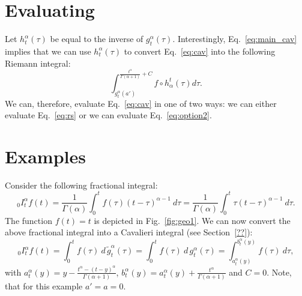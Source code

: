\documentclass[twoside,reqno,11pt]{fcaa-var} %
\begin{document}

\section{Evaluating}
\noindent
Let $h_t^{\alpha}(\tau)$ be equal to the inverse of $g_t^{\alpha}(\tau)$. Interestingly, Eq.~\eqref{eq:main_cav} implies that we can use $h_t^{\alpha}(\tau)$ to convert Eq.~\eqref{eq:cav} into the following Riemann integral:
\begin{equation}
\label{eq:option2}
\int_{g_t^{\alpha}(a')}^{\frac{t^{\alpha}}{\Gamma(\alpha+1)}+C} f\circ h_{\alpha}^t (\tau) d\tau.  
\end{equation}
We can, therefore, evaluate Eq.~\eqref{eq:cav} in one of two ways: we can either evaluate Eq.~\eqref{eq:rs} or we can evaluate Eq.~\eqref{eq:option2}.

\section{Examples}
Consider the following fractional integral:
\begin{equation}
\label{eq:ex1_raw}
_0I_t^{\alpha} f(t) = \frac{1}{\Gamma(\alpha)}\int_0^t f(\tau) (t-\tau)^{\alpha-1}~d\tau = \frac{1}{\Gamma(\alpha)}\int_0^t \tau(t-\tau)^{\alpha-1}~d\tau. 
\end{equation}
The function $f(t) = t$ is depicted in Fig.~\ref{fig:geo1}. We can now convert the above fractional integral into a Cavalieri integral (see Section~\ref{??}):
\begin{equation}
\label{eq:ex1}
_0I_t^{\alpha} f(t) = \int_0^t f(\tau)~d\,\widetilde{g}_t^{\alpha}(\tau)=\int_0^t f(\tau)~d\,g_t^{\alpha}(\tau)=\int_{a_t^{\alpha}(y)}^{b_t^{\alpha}(y)} f(\tau)~d\tau,
\end{equation}
with $a_t^{\alpha}(y) = y - \frac{t^{\alpha}-(t-y)^{\alpha}}{\Gamma(\alpha+1)}$, $b_t^{\alpha}(y) = a_t^{\alpha}(y) + \frac{t^{\alpha}}{\Gamma(\alpha+1)}$ and $C=0$.
Note, that for this example $a'=a=0$.\\ 
\end{document}
